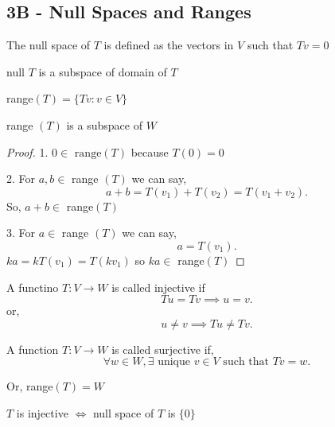 \subsection*{3B - Null Spaces and Ranges}

\begin{definition}
    The null space of $T$ is defined as the vectors in $V$ such that $Tv = 0$
\end{definition}

\begin{lemma}
    null $T$ is a subspace of domain of $T$
\end{lemma}
\begin{definition}[Range]
    range$(T) = \{Tv : v \in V\}$
\end{definition}


\begin{lemma}
    range $(T)$ is a subspace of $W$
\end{lemma}
\begin{proof}
    1. $0 \in \text{ range}(T)$ because  $T(0) = 0$

    2. For $a,b \in$ range $(T)$ we can say, \[
    a + b = T(v_1) + T(v_2) = T(v_1 + v_2)
    .\] 
    So, $a + b \in $ range$(T)$

    3. For $a \in $ range  $(T)$ we can say,  \[
    a = T(v_1)
    .\] 
    $ka = k T(v_1) = T(kv_1)$
    so $ka \in $ range$(T)$
\end{proof}


\begin{definition}[Injective]
    A functino $T: V \rightarrow W$  is called injective if \[
    Tu = Tv \implies u = v
    .\] 
    or, \[
    u \ne v \implies Tu \ne Tv
    .\] 
\end{definition}

\begin{definition}[Surjective]  
    A function $T: V \rightarrow W$  is called surjective if, \[
        \forall w \in W, \exists \text{ unique } v \in V \text{ such that } Tv = w
    .\] 

    Or, range$(T) = W$
\end{definition}


\begin{lemma}
    $T$ is injective $\iff$ null space of  $T$ is $\{0\}$
\end{lemma}
